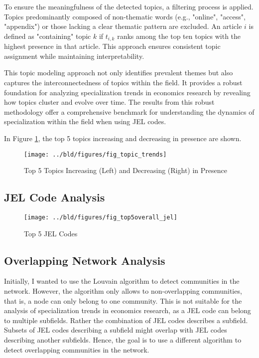 \documentclass[11pt, a4paper, leqno]{article}
\begin{document}
To ensure the meaningfulness of the detected topics, a filtering process is applied.
Topics predominantly composed of non-thematic words (e.g., "online", "access", "appendix") or those lacking a clear thematic pattern are excluded.
An article $i$ is defined as "containing" topic $k$ if $t_{i,k}$ ranks among the top ten topics with the highest presence in that article.
This approach ensures consistent topic assignment while maintaining interpretability.

This topic modeling approach not only identifies prevalent themes but also captures the interconnectedness of topics within the field.
It provides a robust foundation for analyzing specialization trends in economics research by revealing how topics cluster and evolve over time.
The results from this robust methodology offer a comprehensive benchmark for understanding the dynamics of specialization within the field when using JEL codes.

In Figure \ref{fig:top5_increasing_decreasing_topics}, the top 5 topics increasing and decreasing in presence are shown.


\begin{figure}
    \centering
    \texttt{[image: ../bld/figures/fig\_topic\_trends]}
    \caption{Top 5 Topics Increasing (Left) and Decreasing (Right) in Presence}
    \label{fig:top5_increasing_decreasing_topics}
\end{figure}

\subsection{JEL Code Analysis}

\begin{figure}
    \centering
    \texttt{[image: ../bld/figures/fig\_top5overall\_jel]}
    \caption{Top 5 JEL Codes}
    \label{fig:top5overall_jel}
\end{figure}

\subsection{Overlapping Network Analysis}
Initially, I wanted to use the Louvain algorithm to detect communities in the network.
However, the algorithm only allows to non-overlapping communities, that is, a node can only belong to one community.
This is not suitable for the analysis of specialization trends in economics research, as a JEL code can belong to multiple subfields.
Rather the combination of JEL codes describes a subfield.
Subsets of JEL codes describing a subfield might overlap with JEL codes describing another subfields.
Hence, the goal is to use a different algorithm to detect overlapping communities in the network.
\end{document}
